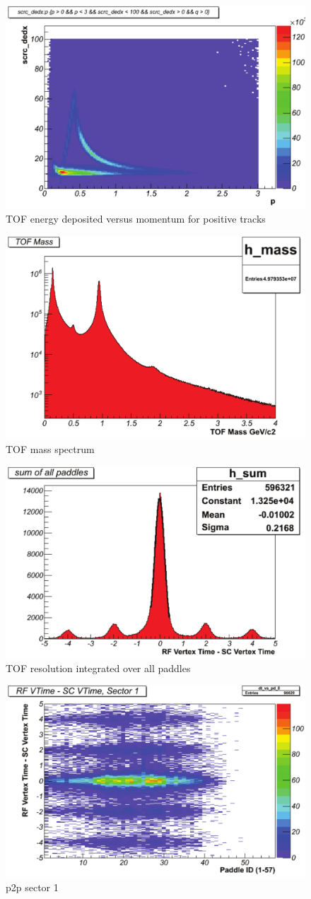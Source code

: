 \begin{figure}\begin{center}
    \includegraphics[width=.40\linewidth]{figures/calib/tof/Tof_56855_final_dedxp.pdf}
    \caption{TOF energy deposited versus momentum for positive tracks}
    \label{plt:tofEvppos}
\end{center}\end{figure}

\begin{figure}\begin{center}
    \includegraphics[width=.40\linewidth]{figures/calib/tof/Tof_56855_final_mass.pdf}
    \caption{TOF mass spectrum}
    \label{plt:tofmass}
\end{center}\end{figure}

\begin{figure}\begin{center}
    \includegraphics[width=.40\linewidth]{figures/calib/tof/Tof_56855_final_resolution.pdf}
    \caption{TOF resolution integrated over all paddles}
    \label{plt:tofres}
\end{center}\end{figure}

\begin{figure}\begin{center}
    \includegraphics[width=.40\linewidth]{figures/calib/tof/Tof_56855_final_s1p2p.pdf}
    \caption{p2p sector 1}
    \label{plt:tofsec1}
\end{center}\end{figure}

